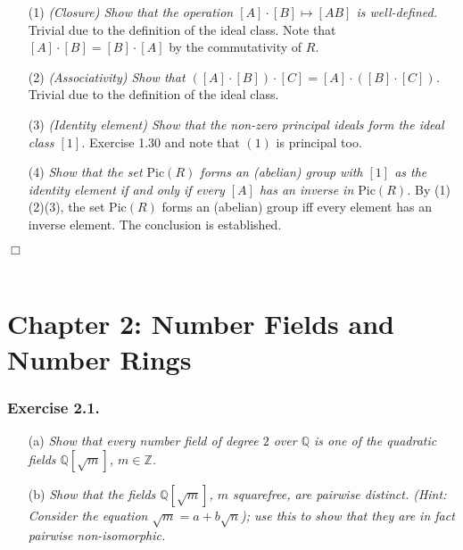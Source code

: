 \documentclass{article}
\begin{document}
\begin{enumerate}
\item[(1)]
\emph{(Closure) Show that the operation $[A] \cdot [B] \mapsto [AB]$ is well-defined. }
Trivial due to the definition of the ideal class.
Note that $[A] \cdot [B] = [B] \cdot [A]$ by the commutativity of $R$.
\item[(2)]
\emph{(Associativity) Show that $([A] \cdot [B]) \cdot [C] = [A] \cdot ([B] \cdot [C])$. }
Trivial due to the definition of the ideal class.
\item[(3)]
\emph{(Identity element) Show that the non-zero principal ideals form the ideal class $[1]$. }
Exercise 1.30 and note that $(1)$ is principal too.
\item[(4)]
\emph{Show that the set $\text{Pic}(R)$ forms an (abelian) group with $[1]$
as the identity element if and only if every $[A]$ has an inverse in $\text{Pic}(R)$.}
By (1)(2)(3), the set $\text{Pic}(R)$ forms an (abelian) group iff
every element has an inverse element. The conclusion is established.
\end{enumerate}
$\Box$ \\\\






\newpage
\section*{Chapter 2: Number Fields and Number Rings \\}



\subsubsection*{Exercise 2.1.}
\begin{enumerate}
\item[(a)]
\emph{Show that every number field of degree $2$ over $\mathbb{Q}$
is one of the quadratic fields $\mathbb{Q}[\sqrt{m}]$, $m \in \mathbb{Z}$.}
\item[(b)]
\emph{Show that the fields $\mathbb{Q}[\sqrt{m}]$, $m$ squarefree,
are pairwise distinct.
(Hint: Consider the equation $\sqrt{m} = a+b\sqrt{n}$);
use this to show that they are in fact pairwise non-isomorphic.} \\
\end{enumerate}
\end{document}
